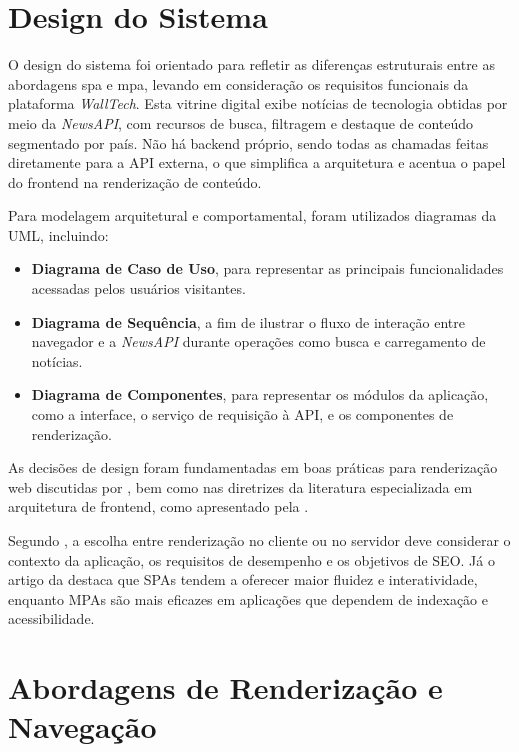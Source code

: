 \section{Design do Sistema}
\label{cap:design}

O design do sistema foi orientado para refletir as diferenças estruturais entre as abordagens \acrshort{spa} e \acrshort{mpa}, levando em consideração os requisitos funcionais da plataforma \textit{WallTech}. Esta vitrine digital exibe notícias de tecnologia obtidas por meio da \textit{NewsAPI}, com recursos de busca, filtragem e destaque de conteúdo segmentado por país. Não há backend próprio, sendo todas as chamadas feitas diretamente para a API externa, o que simplifica a arquitetura e acentua o papel do frontend na renderização de conteúdo.

Para modelagem arquitetural e comportamental, foram utilizados diagramas da UML, incluindo:
\begin{itemize}
  \item \textbf{Diagrama de Caso de Uso}, para representar as principais funcionalidades acessadas pelos usuários visitantes.
  \item \textbf{Diagrama de Sequência}, a fim de ilustrar o fluxo de interação entre navegador e a \textit{NewsAPI} durante operações como busca e carregamento de notícias.
  \item \textbf{Diagrama de Componentes}, para representar os módulos da aplicação, como a interface, o serviço de requisição à API, e os componentes de renderização.
\end{itemize}

As decisões de design foram fundamentadas em boas práticas para renderização web discutidas por \cite{osmani2025}, bem como nas diretrizes da literatura especializada em arquitetura de frontend, como apresentado pela \cite{atori2024}.

Segundo \cite{osmani2025}, a escolha entre renderização no cliente ou no servidor deve considerar o contexto da aplicação, os requisitos de desempenho e os objetivos de SEO. Já o artigo da \cite{atori2024} destaca que SPAs tendem a oferecer maior fluidez e interatividade, enquanto MPAs são mais eficazes em aplicações que dependem de indexação e acessibilidade.

\section{Abordagens de Renderização e Navegação}
\label{section:abordagens-renderizacao}

